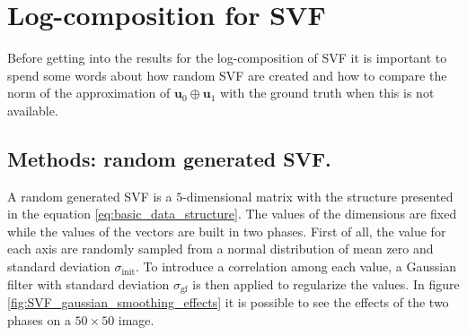 \section{Log-composition for SVF}
Before getting into the results for the log-composition of SVF it is important to spend some words about how random SVF are created and how to compare the norm of the approximation of $\mathbf{u}_0\oplus \mathbf{u}_1$ with the ground truth when this is not available.

\subsection{Methods: random generated SVF.}
A random generated SVF is a $5$-dimensional matrix with the structure presented in the equation \ref{eq:basic_data_structure}. 
The values of the dimensions are fixed while the values of the vectors are built in two phases. First of all, the value for each axis are randomly sampled from a normal distribution of mean zero and standard deviation $\sigma_{\text{init}}$. To introduce a correlation among each value, a Gaussian filter with standard deviation $\sigma_{\text{gf}}$ is then applied to regularize the values. In figure \ref{fig:SVF_gaussian_smoothing_effects} it is possible to see the effects of the two phases on a $50\times 50$ image.

